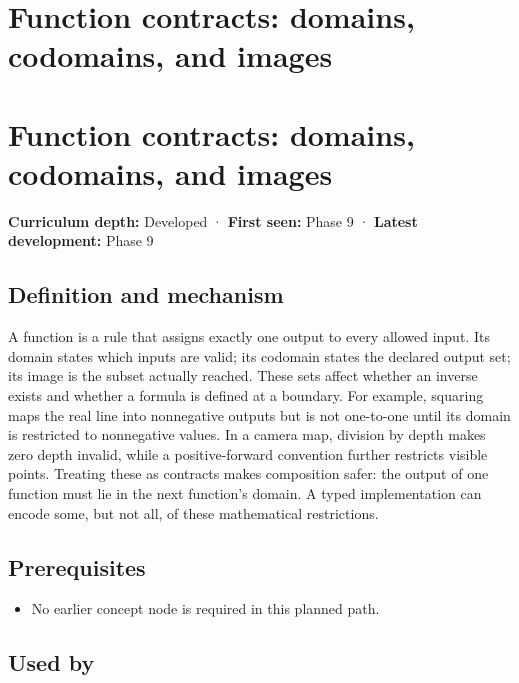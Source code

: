 \hypertarget{appendix-a59658325cd6}{}
\section*{Function contracts: domains, codomains, and images}
\section{Function contracts: domains, codomains, and images}\label{appendix-a59658325cd6-function-contracts-domains-codomains-and-images}

\textbf{Curriculum depth:} Developed · \textbf{First seen:} Phase 9 · \textbf{Latest development:} Phase 9

\subsection{Definition and mechanism}\label{appendix-a59658325cd6-definition-and-mechanism}

A function is a rule that assigns exactly one output to every allowed input. Its domain states which inputs are valid; its codomain states the declared output set; its image is the subset actually reached. These sets affect whether an inverse exists and whether a formula is defined at a boundary. For example, squaring maps the real line into nonnegative outputs but is not one-to-one until its domain is restricted to nonnegative values. In a camera map, division by depth makes zero depth invalid, while a positive-forward convention further restricts visible points. Treating these as contracts makes composition safer: the output of one function must lie in the next function's domain. A typed implementation can encode some, but not all, of these mathematical restrictions.

\subsection{Prerequisites}\label{appendix-a59658325cd6-prerequisites}

\begin{itemize}
\tightlist
\item
  No earlier concept node is required in this planned path.
\end{itemize}

\subsection{Used by}\label{appendix-a59658325cd6-used-by}

